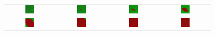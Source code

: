 \begin{figure}[h]
\centering
\mySfFamily
\begin{tabular}{c c c c}
\includegraphics[width = 0.19\textwidth]{../images/predator_prey_f1e6_d1e5} & \includegraphics[width = 0.19\textwidth]{../images/../images/predator_prey_f1e6_d1e5_i1} & \includegraphics[width = 0.19\textwidth]{../images/../images/predator_prey_f1e6_d1e5_i2} & \includegraphics[width = 0.19\textwidth]{../images/../images/predator_prey_f1e6_d1e5_i3}\\[2ex]
\includegraphics[width = 0.19\textwidth]{../images/predator_prey_f1e6_d1e5_i4} & \includegraphics[width = 0.19\textwidth]{../images/../images/predator_prey_f1e6_d1e5_i5} & \includegraphics[width = 0.19\textwidth]{../images/../images/predator_prey_f1e6_d1e5_i6} & \includegraphics[width = 0.19\textwidth]{../images/../images/predator_prey_f1e6_d1e5_i7}

\end{tabular}
\end{figure}
